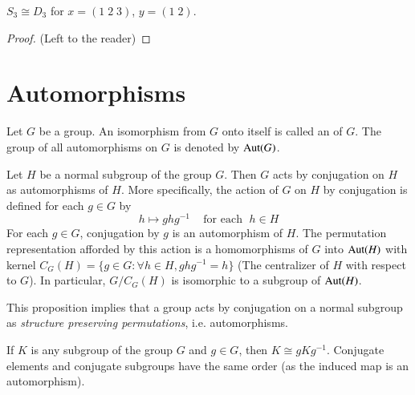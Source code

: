 \begin{corollary}
    $S_3 \cong D_3$ for $x = (1\;2\;3)$, $y = (1\;2)$.
    \begin{proof}
        (Left to the reader)
    \end{proof}
\end{corollary}



\section{ Automorphisms}

\begin{definition}
    Let $G$ be a group. An isomorphism from $G$ onto itself is called an  of $G$. The group of all automorphisms on $G$ is denoted by $\operatorname{Aut}(G)$.
\end{definition}


\begin{proposition}
    Let $H$ be a normal subgroup of the group $G$. Then $G$ acts by conjugation on $H$ as automorphisms of $H$. More specifically, the action of $G$ on $H$ by conjugation is defined for each $g \in G$ by \begin{equation*}
        h\mapsto ghg^{-1}\;\;\;\text{ for each }\;h\in H
    \end{equation*}
    For each $g \in G$, conjugation by $g$ is an automorphism of $H$. The permutation representation afforded by this action is a homomorphisms of $G$ into $\operatorname{Aut}(H)$ with kernel $C_G(H) = \{g \in G:\forall h\in H, ghg^{-1} =h\}$ (The centralizer of $H$ with respect to $G$). In particular, $G/C_G(H)$ is isomorphic to a subgroup of $\operatorname{Aut}(H)$.
\end{proposition}

\begin{remark}
    This proposition implies that a group acts by conjugation on a normal subgroup as \emph{structure preserving permutations}, i.e. automorphisms.
\end{remark}

\begin{corollary}
    If $K$ is any subgroup of the group $G$ and $g \in G$, then $K \cong gKg^{-1}$. Conjugate elements and conjugate subgroups have the same order (as the induced map is an automorphism).
\end{corollary}


